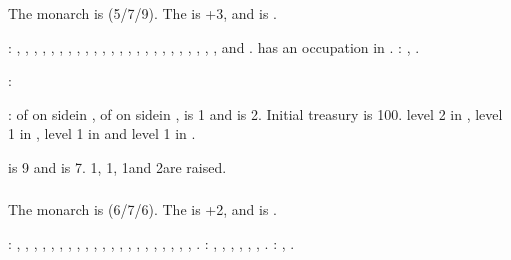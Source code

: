 \subsubsection{\paysmajeurFrance}
\aparag The monarch is  (5/7/9). The \STAB is +3, and
\FRA is .

: \provinceFinistere, \provinceArmor,
\provinceMorbihan, \provinceVendee, \provincePoitou, \provinceLimousin,
\provinceTouraine, \provinceMaine, \provinceNormandie, \provinceCaux,
, \provinceOrleanais, \provinceBerry,
\provinceAuvergne, \provinceCevennes, \provinceQuercy, \provinceGuyenne,
\provinceBearn, \provinceLanguedoc, \provinceProvence, \provinceDauphine,
\provinceLyonnais, \provinceBourgogne, \provinceTroyes, \provinceChampagne and
\provincePicardie.
\bparag[] [BLP] \paysSavoie has an occupation in \provinceDauphine.
: \seazoneAcores, \seazoneCanarias.

:
\begin{modlist}
\item[\MA] \payssavoie
\end{modlist}

:
\bparag \MNU of  on side\facemoins in \provinceChampagne, \MNU of
 on side\facemoins in \provinceGuyenne, \FTI is 1 and \DTI is 2.
\bparag Initial treasury is 100\ducats.
\bparag \TradeFLEET level 2 in , level 1 in , level 1 in
 and level 1 in .

\aparag {} is 9 and  is
7. 1\ARMY\faceplus, 1\ARMY\facemoins, 1\ND and 2\NGD are raised.


\subsubsection{\paysmajeurEspagne}
\aparag The monarch is  (6/7/6). The \STAB is
+2, and \SPA is .

: \provinceGaliza, \provinceSalamanca,
\provinceExtremadura, \provinceHuelva, \provinceGibraltar, \provinceGranada,
\provinceMurcia, , \provinceToledo, , , \provinceAsturias, \provinceVizcaya,
\provinceNavarra, \provincePirineos, \provinceCatalunya, \provinceLeon,
\provinceCaceres, \provinceAndalucia, \provinceCordoba, \provinceValencia,
\provinceAragon.
: , \provinceRosselo,
\provinceSaldigna, \provinceSicilia, \provincePalermo, \provinceMalta,
\provinceCanarias.
: \seazoneAcores, \seazoneCanarias.


